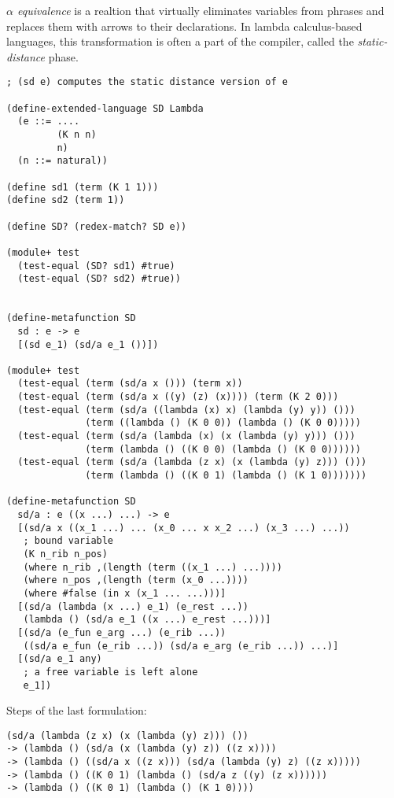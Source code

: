 \textit{$\alpha$ equivalence} is a realtion that virtually eliminates variables
from phrases and replaces them with arrows to their declarations. In
lambda calculus-based languages, this transformation is often a part of the
compiler, called the \textit{static-distance} phase.

\begin{lstlisting}[frame=none,numbers=none]
; (sd e) computes the static distance version of e

(define-extended-language SD Lambda
  (e ::= ....
         (K n n)
         n)
  (n ::= natural))

(define sd1 (term (K 1 1)))
(define sd2 (term 1))

(define SD? (redex-match? SD e))

(module+ test
  (test-equal (SD? sd1) #true)
  (test-equal (SD? sd2) #true))


(define-metafunction SD
  sd : e -> e
  [(sd e_1) (sd/a e_1 ())])

(module+ test
  (test-equal (term (sd/a x ())) (term x))
  (test-equal (term (sd/a x ((y) (z) (x)))) (term (K 2 0)))
  (test-equal (term (sd/a ((lambda (x) x) (lambda (y) y)) ()))
              (term ((lambda () (K 0 0)) (lambda () (K 0 0)))))
  (test-equal (term (sd/a (lambda (x) (x (lambda (y) y))) ()))
              (term (lambda () ((K 0 0) (lambda () (K 0 0))))))
  (test-equal (term (sd/a (lambda (z x) (x (lambda (y) z))) ()))
              (term (lambda () ((K 0 1) (lambda () (K 1 0)))))))

(define-metafunction SD
  sd/a : e ((x ...) ...) -> e
  [(sd/a x ((x_1 ...) ... (x_0 ... x x_2 ...) (x_3 ...) ...))
   ; bound variable
   (K n_rib n_pos)
   (where n_rib ,(length (term ((x_1 ...) ...))))
   (where n_pos ,(length (term (x_0 ...))))
   (where #false (in x (x_1 ... ...)))]
  [(sd/a (lambda (x ...) e_1) (e_rest ...))
   (lambda () (sd/a e_1 ((x ...) e_rest ...)))]
  [(sd/a (e_fun e_arg ...) (e_rib ...))
   ((sd/a e_fun (e_rib ...)) (sd/a e_arg (e_rib ...)) ...)]
  [(sd/a e_1 any)
   ; a free variable is left alone
   e_1])
\end{lstlisting}

Steps of the last formulation:

\begin{lstlisting}[frame=none,numbers=none]
   (sd/a (lambda (z x) (x (lambda (y) z))) ())
-> (lambda () (sd/a (x (lambda (y) z)) ((z x))))
-> (lambda () ((sd/a x ((z x))) (sd/a (lambda (y) z) ((z x)))))
-> (lambda () ((K 0 1) (lambda () (sd/a z ((y) (z x))))))
-> (lambda () ((K 0 1) (lambda () (K 1 0))))
\end{lstlisting}


